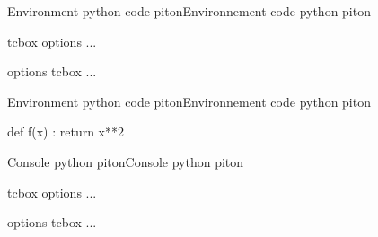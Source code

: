 \documentclass[a4paper,english,11pt]{article}
\begin{document}
\begin{myprestexcode}{Environment python code piton}{Environnement code python piton}
\begin{pflpitoncode}[<keys>]{tcbox options} ... \end{pflpitoncode}
\begin{CodePiton}[<clés>]{options tcbox}    ... \end{CodePiton}

\end{myprestexcode}

\begin{myprestex}{Environment python code piton}{Environnement code python piton}
\begin{pflpitoncode}%
	[gobble=tabs,width=12cm,style=lightcarbon]{}
def f(x) :
	return x**2
\end{pflpitoncode}
\end{myprestex}

\begin{myprestexcode}{Console python piton}{Console python piton}
\begin{pflpitonconsole}[<keys>]{tcbox options} ... \end{pflpitonconsole}
\begin{ConsolePiton}[<clés>]{options tcbox}    ... \end{ConsolePiton}

\end{myprestexcode}
\end{document}
